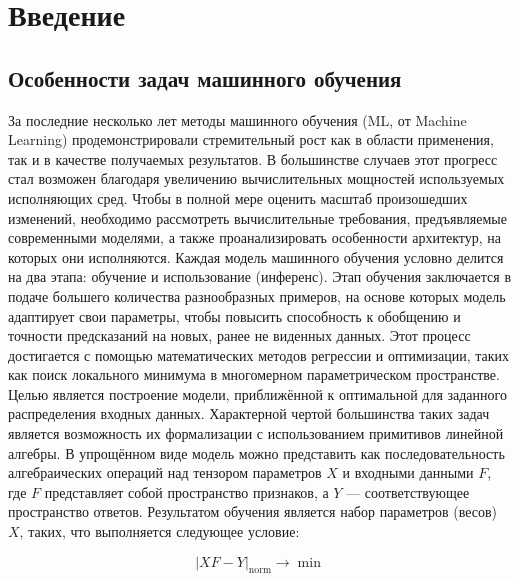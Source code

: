 \section{Введение}
\label{sec:Chapter0} 

\subsection{Особенности задач машинного обучения}

За последние несколько лет методы машинного обучения (ML, от Machine Learning) продемонстрировали стремительный рост как в области применения, так и в качестве получаемых результатов.
В большинстве случаев этот прогресс стал возможен благодаря увеличению вычислительных мощностей используемых исполняющих сред.
Чтобы в полной мере оценить масштаб произошедших изменений, необходимо рассмотреть вычислительные требования, предъявляемые современными моделями, а также проанализировать особенности архитектур, на которых они исполняются.
Каждая модель машинного обучения условно делится на два этапа: обучение и использование (инференс).
Этап обучения заключается в подаче большего количества разнообразных примеров, на основе которых модель адаптирует свои параметры, чтобы повысить способность к обобщению и точности предсказаний на новых, ранее не виденных данных.
Этот процесс достигается с помощью математических методов регрессии и оптимизации, таких как поиск локального минимума в многомерном параметрическом пространстве.
Целью является построение модели, приближённой к оптимальной для заданного распределения входных данных.
Характерной чертой большинства таких задач является возможность их формализации с использованием примитивов линейной алгебры.
В упрощённом виде модель можно представить как последовательность алгебраических операций над тензором параметров $X$ и входными данными $F$, где $F$ представляет собой пространство признаков, а $Y$ — соответствующее пространство ответов.
Результатом обучения является набор параметров (весов) $X$, таких, что выполняется следующее условие:

\begin{equation}
|XF - Y|_{\text{norm}} \rightarrow \min
\end{equation}

